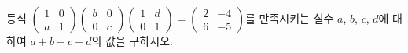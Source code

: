 \hspace*{2mm}\begin{minipage}[t]{\dimexpr\linewidth-2mm\relax}\vspace{0pt}
등식 $\begin{pmatrix} 1 & 0 \\ a & 1 \end{pmatrix}\begin{pmatrix} b & 0 \\ 0 & c \end{pmatrix}\begin{pmatrix} 1 & d \\ 0 & 1 \end{pmatrix}=\begin{pmatrix} 2 & -4 \\ 6 & -5 \end{pmatrix}$를 만족시키는 실수 $a$, $b$, $c$, $d$에 대하여 $a+b+c+d$의 값을 구하시오.\end{minipage}
